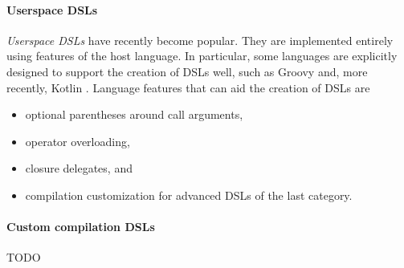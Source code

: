 \paragraph{Userspace DSLs}
\textit{Userspace DSLs} have recently become popular.
They are implemented entirely using features of the host language.
In particular, some languages are explicitly designed to
support the creation of DSLs well, such as
Groovy \autocite[Chapter 3.15: Domain-Specific Languages]{GroovyDoc}
and, more recently,
Kotlin \autocite[Chapter: Type-Safe Builders]{KotlinDoc}.
Language features that can aid the creation of DSLs are
\autocite[Chapter 3.15: Domain-Specific Languages]{GroovyDoc}
\begin{itemize}
  \item optional parentheses around call arguments,
  \item operator overloading,
  \item closure delegates, and
  \item compilation customization for advanced DSLs of the last category.
\end{itemize}

\paragraph{Custom compilation DSLs}
TODO

